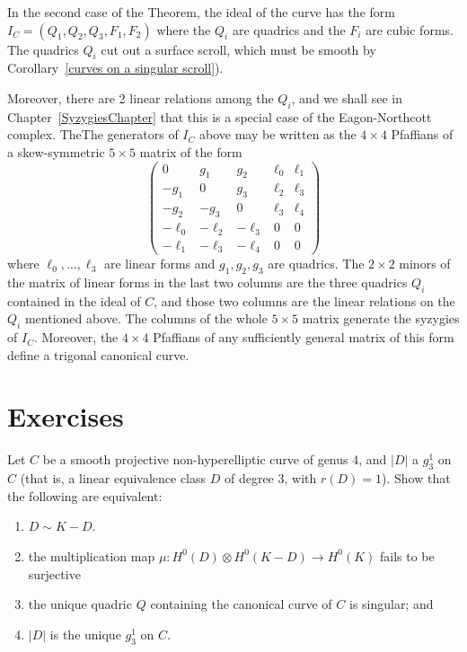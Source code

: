 \begin{fact}
In the second case of the Theorem, the ideal of the curve has the form $I_C = (Q_1, Q_2, Q_3, F_1, F_2)$ 
where the $Q_i$ are quadrics and the $F_i$ are cubic forms. The quadrics $Q_i$ cut out a surface scroll, which
must be smooth by Corollary~\ref{curves on a singular scroll}).

Moreover, there are 2 linear relations among the
$Q_i$, and we shall see in Chapter~\ref{SyzygiesChapter} that this is a special case of the Eagon-Northcott
complex. TheThe generators of $I_C$ above may be written as the $4\times 4$ Pfaffians
of a skew-symmetric $5\times 5$ matrix of the form
$$
\begin{pmatrix}
0&g_1&g_2&\ell_0&\ell_1\\
-g_1&0&g_3&\ell_2&\ell_3\\
-g_2&-g_3&0 &\ell_3&\ell_4\\
-\ell_0&-\ell_2&-\ell_3&0&0\\
-\ell_1&-\ell_3&-\ell_4&0&0
\end{pmatrix}
$$
where $\ell_0,\dots,\ell_3$ are linear forms and $g_1, g_2, g_3$ are quadrics. The
 $2\times 2$
minors of the matrix of linear forms in the last two columns are the three quadrics $Q_i$ contained in the ideal
of $C$, and those two columns are the linear relations on the $Q_i$ mentioned above.
The columns of the whole $5\times 5$ matrix generate the syzygies of $I_C$. Moreover, the
$4\times 4$ Pfaffians of any sufficiently general matrix of this form define a trigonal canonical curve.
\end{fact}



\section{Exercises}

\begin{exercise} \label{ex7.1}
Let $C$ be a smooth projective non-hyperelliptic curve of genus 4, and $|D|$ a $g^1_3$ on $C$ (that is, a linear equivalence class $D$ of degree 3, with $r(D) = 1$). Show that the following are equivalent:
\begin{enumerate}
\item $D \sim K-D$. 
\item the multiplication map $\mu : H^0(D) \otimes H^0(K-D) \to H^0(K)$ fails to be surjective
\item the unique quadric $Q$ containing the canonical curve of $C$ is singular; and
\item $|D|$ is the unique $g^1_3$ on $C$.
\end{enumerate}
\end{exercise}

